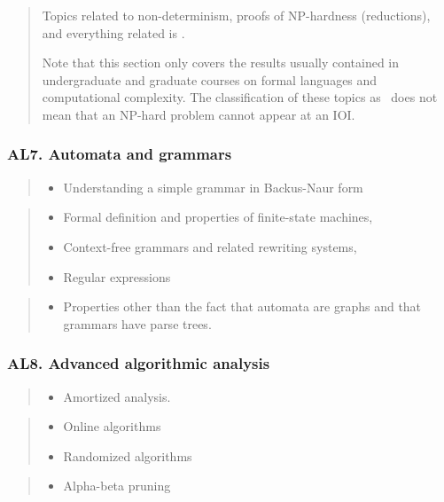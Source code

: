 \documentclass[a4paper,11pt,oneside]{article}
\newcommand{\cmark}{\ding{51}}%
\newcommand{\xmark}{\ding{55}}%
\newcommand{\cdefi}{{\small\cmark\faFileTextO}}
\newcommand{\ccode}{{\small\cmark\faFileText}}
\newcommand{\cnfoc}{{\small\faQuestion}}
\newcommand{\cexcl}{{\small\xmark}}
\newcommand{\Idefine}{\item[\hbox to 1.8em{\cdefi\hfill}]}
\newcommand{\Icodeonly}{\item[\hbox to 1.8em{\ccode\hfill}]}
\newcommand{\Inofocus}{\item[\hbox to 1.8em{\cnfoc\hfill}]}
\newcommand{\Iexcluded}{\item[\hbox to 1.8em{\cexcl\hfill}]}
\newenvironment{myitemize}{\begin{quote}\begin{itemize}\itemsep 0pt}{\end{itemize}\end{quote}}
\begin{document}
    \begin{quote}
    Topics related to non-determinism, proofs of NP-hardness (reductions),
    and everything related is \cexcl.

    Note that this section only covers the results usually contained in
    undergraduate and graduate courses on formal languages and 
    computational complexity. The classification of these topics
    as \cexcl\ does not mean that an NP-hard 
    problem cannot appear at an IOI.
    \end{quote}

    \subsubsection*{AL7. Automata and grammars}%

    \begin{myitemize}
    \Idefine Understanding a simple grammar in Backus-Naur form
    \end{myitemize}

    \begin{myitemize}
    \Inofocus Formal definition and properties of finite-state machines,
    \Inofocus Context-free grammars and related rewriting systems,
    \Inofocus Regular expressions
    \end{myitemize}
  
    \begin{myitemize}
    \Iexcluded Properties other than the fact that automata are graphs and that grammars have parse trees.
    \end{myitemize}
  
    \subsubsection*{AL8. Advanced algorithmic analysis}%

    \begin{myitemize}
    \Icodeonly Amortized analysis.
    \end{myitemize}

    \begin{myitemize}
    \Inofocus Online algorithms
    \Inofocus Randomized algorithms
    \end{myitemize}

    \begin{myitemize}
    \Iexcluded Alpha-beta pruning
    \end{myitemize}
    
\end{document}
